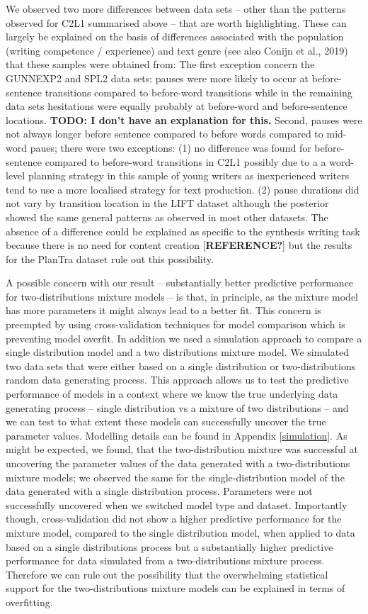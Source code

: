 \documentclass[
  man,floatsintext]{apa7}
\begin{document}
We observed two more differences between data sets -- other than the patterns observed for C2L1 summarised above -- that are worth highlighting. These can largely be explained on the basis of differences associated with the population (writing competence / experience) and text genre (see also Conijn et al., 2019) that these samples were obtained from: The first exception concern the GUNNEXP2 and SPL2 data sets: pauses were more likely to occur at before-sentence transitions compared to before-word transitions while in the remaining data sets hesitations were equally probably at before-word and before-sentence locations. \textbf{TODO: I don't have an explanation for this.} Second, pauses were not always longer before sentence compared to before words compared to mid-word paues; there were two exceptions: (1) no difference was found for before-sentence compared to before-word transitions in C2L1 possibly due to a a word-level planning strategy in this sample of young writers as inexperienced writers tend to use a more localised strategy for text production. (2) pause durations did not vary by transition location in the LIFT dataset although the posterior showed the same general patterns as observed in most other datasets. The absence of a difference could be explained as specific to the synthesis writing task because there is no need for content creation {[}\textbf{REFERENCE?}{]} but the results for the PlanTra dataset rule out this possibility.

A possible concern with our result -- substantially better predictive performance for two-distributions mixture models -- is that, in principle, as the mixture model has more parameters it might always lead to a better fit. This concern is preempted by using cross-validation techniques for model comparison which is preventing model overfit. In addition we used a simulation approach to compare a single distribution model and a two distributions mixture model. We simulated two data sets that were either based on a single distribution or two-distributions random data generating process. This approach allows us to test the predictive performance of models in a context where we know the true underlying data generating process -- single distribution vs a mixture of two distributions -- and we can test to what extent these models can successfully uncover the true parameter values. Modelling details can be found in Appendix \ref{simulation}. As might be expected, we found, that the two-distribution mixture was successful at uncovering the parameter values of the data generated with a two-distributions mixture models; we observed the same for the single-distribution model of the data generated with a single distribution process. Parameters were not successfully uncovered when we switched model type and dataset. Importantly though, cross-validation did not show a higher predictive performance for the mixture model, compared to the single distribution model, when applied to data based on a single distributions process but a substantially higher predictive performance for data simulated from a two-distributions mixture process. Therefore we can rule out the possibility that the overwhelming statistical support for the two-distributions mixture models can be explained in terms of overfitting.
\end{document}

